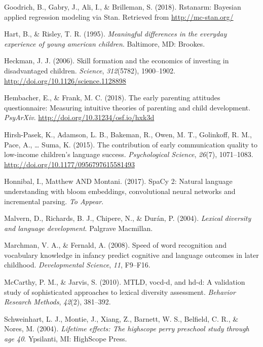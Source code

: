 \documentclass[man,floatsintext]{apa6}
\begin{document}
\leavevmode\hypertarget{ref-rstanarm}{}%
Goodrich, B., Gabry, J., Ali, I., \& Brilleman, S. (2018). Rstanarm: Bayesian applied regression modeling via Stan. Retrieved from \url{http://mc-stan.org/}

\leavevmode\hypertarget{ref-Hart1995}{}%
Hart, B., \& Risley, T. R. (1995). \emph{Meaningful differences in the everyday experience of young american children}. Baltimore, MD: Brookes.

\leavevmode\hypertarget{ref-Heckman2006}{}%
Heckman, J. J. (2006). Skill formation and the economics of investing in disadvantaged children. \emph{Science}, \emph{312}(5782), 1900--1902. \url{http://doi.org/10.1126/science.1128898}

\leavevmode\hypertarget{ref-Hembacher2018}{}%
Hembacher, E., \& Frank, M. C. (2018). The early parenting attitudes questionnaire: Measuring intuitive theories of parenting and child development. \emph{PsyArXiv}. \url{http://doi.org/10.31234/osf.io/hxk3d}

\leavevmode\hypertarget{ref-HirshPasek2015}{}%
Hirsh-Pasek, K., Adamson, L. B., Bakeman, R., Owen, M. T., Golinkoff, R. M., Pace, A., \ldots{} Suma, K. (2015). The contribution of early communication quality to low-income children's language success. \emph{Psychological Science}, \emph{26}(7), 1071--1083. \url{http://doi.org/10.1177/0956797615581493}

\leavevmode\hypertarget{ref-spacy2}{}%
Honnibal, I., Matthew AND Montani. (2017). SpaCy 2: Natural language understanding with bloom embeddings, convolutional neural networks and incremental parsing. \emph{To Appear}.

\leavevmode\hypertarget{ref-Malvern2004}{}%
Malvern, D., Richards, B. J., Chipere, N., \& Durán, P. (2004). \emph{Lexical diversity and language development}. Palgrave Macmillan.

\leavevmode\hypertarget{ref-Marchman2008}{}%
Marchman, V. A., \& Fernald, A. (2008). Speed of word recognition and vocabulary knowledge in infancy predict cognitive and language outcomes in later childhood. \emph{Developmental Science}, \emph{11}, F9--F16.

\leavevmode\hypertarget{ref-McCarthy2010}{}%
McCarthy, P. M., \& Jarvis, S. (2010). MTLD, vocd-d, and hd-d: A validation study of sophisticated approaches to lexical diversity assessment. \emph{Behavior Research Methods}, \emph{42}(2), 381--392.

\leavevmode\hypertarget{ref-PerryPreschool2004}{}%
Schweinhart, L. J., Montie, J., Xiang, Z., Barnett, W. S., Belfield, C. R., \& Nores, M. (2004). \emph{Lifetime effects: The highscope perry preschool study through age 40}. Ypsilanti, MI: HighScope Press.
\end{document}
